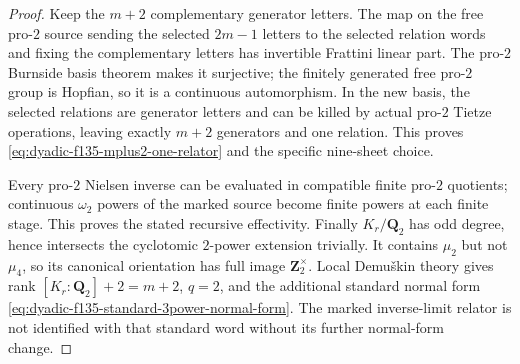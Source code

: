 \begin{proof}
Keep the
$m+2$
complementary
generator
letters.
The map on the
free pro-$2$
source sending
the selected
$2m-1$
letters to
the selected
relation words
and fixing
the complementary
letters has
invertible
Frattini linear
part.
The pro-$2$
Burnside basis
theorem makes
it surjective;
the finitely
generated free
pro-$2$ group
is Hopfian,
so it is a
continuous
automorphism.
In the new
basis, the
selected
relations are
generator
letters and
can be
killed by
actual
pro-$2$
Tietze operations,
leaving exactly
$m+2$ generators
and one
relation.
This proves
\eqref{eq:dyadic-f135-mplus2-one-relator}
and the
specific
nine-sheet
choice.

Every
pro-$2$ Nielsen
inverse can be
evaluated
in compatible
finite pro-$2$
quotients;
continuous
$\omega_2$
powers of
the marked
source become
finite powers
at each finite
stage.
This proves
the stated
recursive
effectivity.
Finally
$K_r/\mathbf Q_2$
has odd degree,
hence intersects
the cyclotomic
$2$-power
extension
trivially.
It contains
$\mu_2$
but not
$\mu_4$,
so its
canonical
orientation
has full image
$\mathbf Z_2^\times$.
Local
Demu\v{s}kin
theory
\cite{LabuteClassification,NSW}
gives rank
$[K_r:\mathbf Q_2]+2
=m+2$,
$q=2$, and
the additional
standard normal
form
\eqref{eq:dyadic-f135-standard-3power-normal-form}.
The marked
inverse-limit
relator is
not identified
with that
standard word
without its
further
normal-form
change.
\end{proof}

